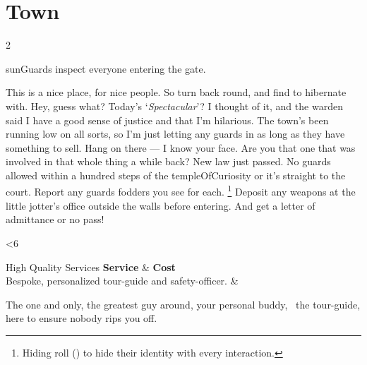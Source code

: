 \section*{Town}

\begin{multicols}{2}

{\sffamily \Glspl{sunGuard} inspect everyone entering the gate.}

\begin{exampletext}
\ifcase\value{temperature}
  \ifcase\value{r0t3}%
    This is a nice place, for nice people.
    So turn back round, and find  to hibernate with.
  \or%
    Hey, guess what?
    Today's `\emph{Spectacular}'?
    I thought of it, and the \gls{warden} said I have a good sense of justice and that I'm hilarious.
  \else%
    The town's been running low on all sorts, so I'm just letting any \glspl{guard} in as long as they have something to sell.
  \fi
\or%
  \ifcase\value{r0t3}%
    Hang on there --- I know your face.
    Are you that one that was involved in that whole thing a while back?
  \or%
    New law just passed.
    No \glspl{guard} allowed within a hundred \glspl{step} of the \gls{templeOfCuriosity} or it's straight to the \gls{court}.
  \or%
    Report any \glspl{guard} \glspl{fodder} you see for  each.%
    \footnote{Hiding  roll  (\tn[6]) to hide their identity with every interaction.}
  \else%
    Deposit any weapons at the little \gls{jotter}'s office outside the walls before entering.
    And get a letter of admittance or no pass!
  \fi%
\fi%
\end{exampletext}

\ifnum\day<6
  \renewcommand\npcsymbol{\flourish}
  \begin{nametable}[Xc]{High Quality Services}
    \textbf{Service} & \textbf{Cost} \\\hline
      Bespoke, personalized tour-guide and safety-officer.
      &  \\
  \end{nametable}
  \begin{speechtext}
    The one and only, the greatest guy around, your personal buddy, \composeHumanName\ the tour-guide, here to ensure nobody rips you off.
  \end{speechtext}
\fi


\end{multicols}
